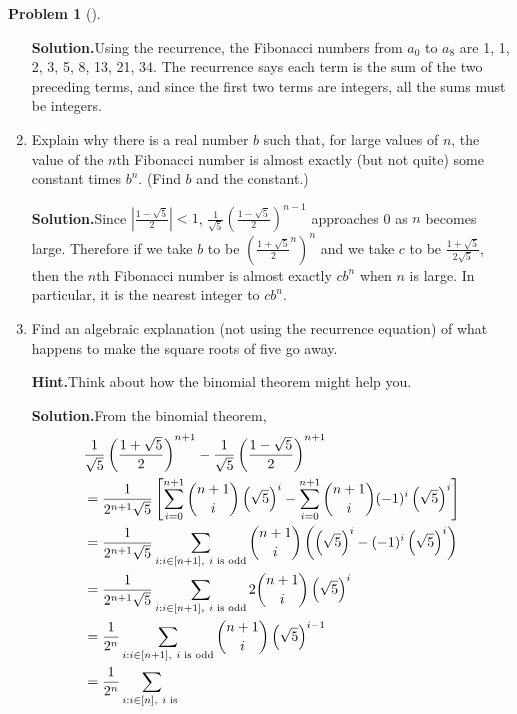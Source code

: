 \documentclass[10pt,]{book}
\theoremstyle{plain}
\theoremstyle{definition}
\newtheorem{activity}[project]{Problem}
\theoremstyle{definition}
\numberwithin{equation}{chapter}
\newcommand{\lt}{<}
\newcommand{\amp}{&}
\begin{document}
\begin{activity}[]
\begin{enumerate}[font=\bfseries,label=(\alph*),ref=\alph*]
\par\medskip\noindent%
\textbf{Solution.}\quad Using the recurrence, the Fibonacci numbers from \(a_0\) to \(a_8\) are 1, 1, 2, 3, 5, 8, 13, 21, 34. The recurrence says each term is the sum of the two preceding terms, and since the first two terms are integers, all the sums must be integers.%
\item\label{task-158} Explain why there is a real number \(b\) such that, for large values of \(n\), the value of the \(n\)th Fibonacci number is almost exactly (but not quite) some constant times \(b^n\). (Find \(b\) and the constant.)%
\par\medskip\noindent%
\textbf{Solution.}\quad Since \(\displaystyle \left|\frac{1-\sqrt{5}}{2}\right| \lt 1\), \(\displaystyle\frac{1}{\sqrt{5}}\left(\frac{1-\sqrt{5}}{2}\right)^{n-1}\) approaches 0 as \(n\) becomes large. Therefore if we take \(b\) to be \(\displaystyle \left(\frac{1+\sqrt{5}}{2}^n\right)^n\) and we take \(c\) to be \(\frac{1+\sqrt{5}}{2\sqrt{5}}\), then the \(n\)th Fibonacci number is almost exactly \(cb^n\) when \(n\) is large. In particular, it is the nearest integer to \(cb^n\).%
\item\label{task-159} Find an algebraic explanation (not using the recurrence equation) of what happens to make the square roots of five go away.%
\par\medskip\noindent%
\textbf{Hint.}\quad Think about how the binomial theorem might help you.%
\par\medskip\noindent%
\textbf{Solution.}\quad From the binomial theorem,%
\begin{align*}
\amp \frac{1}{\sqrt{5}}\left(\frac{1+\sqrt{5}}{   2}\right)^{n+1}- \frac{1}{\sqrt{5}}\left(\frac{1-\sqrt{5}}{2}\right)^{n+1}\\
\amp=
\frac{1}{2^{n+1}\sqrt{5}}\left[\sum_{i=0}^{n+1}\binom{n+1}{i}\left(\sqrt{5}\right)^i -\sum_{i=0}^{n+1} \binom{n+1}{i}(-1)^i\left(\sqrt{5}\right)^i\right]\\
\amp= \frac{1}{2^{n+1}\sqrt{5}}\sum_{i:i\in
[n+1],\ i\mbox{\scriptsize~is odd} }\binom{n+1}{i}\left(\left(\sqrt{5}\right)^i
-(-1)^i\left(\sqrt{5}\right)^i\right)\\
\amp= \frac{1}{2^{n+1}\sqrt{5}}\sum_{i:i\in[n+1],\ i\mbox{\scriptsize~is
odd} }  2\binom{n+1}{i}\left(\sqrt{5}\right)^i\\
\amp= \frac{1}{2^{n}}\sum_{i:i\in[n+1],\ i\mbox{\scriptsize~is
odd} }  \binom{n+1}{i}\left(\sqrt{5}\right)^{i-1}\\
\amp= \frac{1}{2^{n}}\sum_{i:i\in[n],\ i\mbox{\scriptsize~is
}}
\end{align*}
\end{enumerate}
\end{activity}
\end{document}
